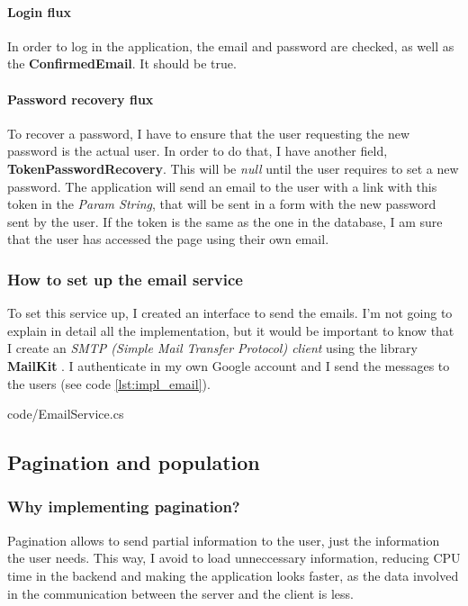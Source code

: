             \paragraph{Login flux}
                In order to log in the application, the email and password are checked, as well as the \textbf{ConfirmedEmail}. It should be true.

            \paragraph{Password recovery flux}
                To recover a password, I have to ensure that the user requesting the new password is the actual user. In order to do that, I have another field, \textbf{TokenPasswordRecovery}. This will be \textit{null} until the user requires to set a new password. 
                The application will send an email to the user with a link with this token in the \textit{Param String}, that will be sent in a form with the new password sent by the user. If the token is the same as the one in the database, I am sure that the user has
                accessed the page using their own email.

        \subsubsection{How to set up the email service}
            To set this service up, I created an interface to send the emails. I'm not going to explain in detail all the implementation, but it would be important to know that I create an \textit{SMTP (Simple Mail Transfer Protocol) client} using the library \textbf{MailKit} \cite{MailKit}.
            I authenticate in my own Google account and I send the messages to the users (see code \ref{lst:impl_email}). 

            
            {code/EmailService.cs}

    \subsection{Pagination and population}
        \subsubsection{Why implementing pagination?}
            Pagination allows to send partial information to the user, just the information the user needs. This way, I avoid to load 
            unneccessary information, reducing CPU time in the backend and making the application looks faster, as the data involved in 
            the communication between the server and the client is less. 

